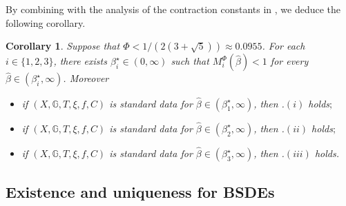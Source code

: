 \documentclass[10pt]{article} %
\newtheorem{corollary}[theorem]{Corollary}
\def \G{\mathbb{G}}
\begin{document}
By combining  with the analysis of the contraction constants in , we deduce the following corollary.

\begin{corollary}\label{cor::main_result_reflected_bsde}
	Suppose that $\Phi < 1/(2(3+\sqrt{5})) \approx 0.0955$. For each $i \in \{1,2,3\}$, there exists $\beta^\star_i \in (0,\infty)$ such that $M^\Phi_i(\hat\beta) <1$ for every $\hat\beta \in (\beta^\star_i,\infty)$. Moreover
	\begin{itemize}
		\item[$(i)$] if $(X,\G,T,\xi,f,C)$ is standard data for $\hat\beta \in (\beta^\star_1,\infty)$, then {\rm{}.$(i)$} holds$;$
		\item[$(ii)$] if $(X,\G,T,\xi,f,C)$ is standard data for $\hat\beta \in (\beta^\star_2,\infty)$, then {\rm{}.$(ii)$} holds$;$
		\item[$(iii)$] if $(X,\G,T,\xi,f,C)$ is standard data for $\hat\beta \in (\beta^\star_3,\infty)$, then {\rm{}.$(iii)$} holds.
	\end{itemize}
\end{corollary}








\subsection{Existence and uniqueness for BSDEs}\label{sec::main_results_bsde}
\end{document}
